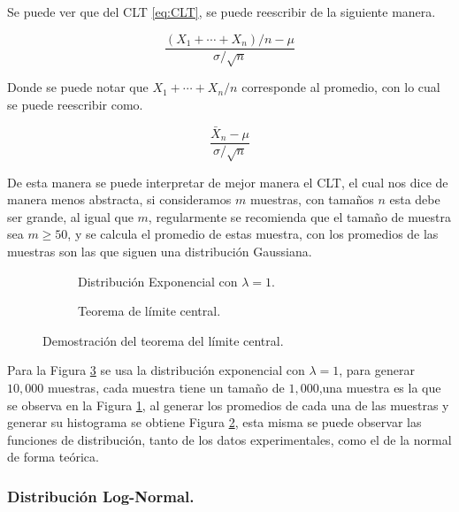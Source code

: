 Se puede ver que del CLT \ref{eq:CLT}, se puede reescribir de la siguiente manera.

\begin{equation*}
	\frac{(X_1+\cdots+X_n)/n - \mu}{\sigma / \sqrt{n}}
\end{equation*}

Donde se puede notar que $X_1+\cdots + X_n/n$ corresponde al promedio, con lo cual se puede reescribir como.

\begin{equation*}
	\frac{\bar{X}_n - \mu}{\sigma / \sqrt{n}}
\end{equation*}

De esta manera se puede interpretar de mejor manera el CLT, el cual nos dice de manera menos abstracta, si consideramos $m$ muestras, con tamaños $n$ esta debe ser grande, al igual que $m$,  regularmente se recomienda que el tamaño de muestra sea $m\geq 50$, y se calcula el promedio de estas muestra, con los promedios de las muestras son las que siguen una distribución Gaussiana.

\begin{figure}[!ht]
    \centering %
    \begin{subfigure}{0.45\textwidth} %
        \centering
        \resizebox{\linewidth}{!}{} %
        \caption{Distribución Exponencial con $\lambda=1$.}
        \label{fig:DisExpo}
    \end{subfigure}
    \hfill
    \begin{subfigure}{0.45\textwidth}
        \centering
        \resizebox{\linewidth}{!}{} %
        \caption{Teorema de límite central.}
        \label{fig:TLC}
    \end{subfigure}
    \caption{Demostración del teorema del límite central.}
    \label{fig:CLT}
\end{figure}

Para la Figura \ref{fig:CLT} se usa la distribución exponencial con $\lambda=1$, para generar $10,000$ muestras, cada muestra tiene un tamaño de $1,000$,una muestra es la que se observa en la Figura \ref{fig:DisExpo}, al generar los promedios de cada una de las muestras y generar su histograma se obtiene Figura \ref{fig:TLC}, esta misma se puede observar las funciones de distribución, tanto de los datos experimentales, como el de la normal de forma teórica.

\subsubsection{Distribución Log-Normal.}

